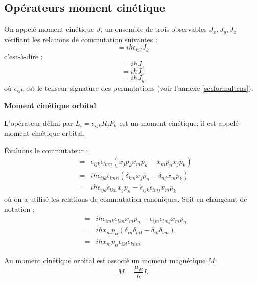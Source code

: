 \documentclass[12pt]{book}
\begin{document}
\subsection{Op\'erateurs moment cin\'etique}
\begin{defn}
On appel\'e moment cin\'etique
$J$, un ensemble de trois observables 
$J_x,J_y,J_z$ v\'erifiant les relations de commutation suivantes :
\begin{equation}
[J_i,J_l]=i\hbar\epsilon_{kil}J_k
\end{equation}
c'est-\`a-dire :
\begin{equation}
[J_x,J_y]=i\hbar J_z
\end{equation}
\begin{equation}
[J_y,J_z]=i\hbar J_x
\end{equation}
\begin{equation}
[J_z,J_x]=i\hbar J_y
\end{equation}
o\`u $\epsilon_{ijk}$ est le tenseur signature des permutations (voir l'annexe
\ref{secformultens}).
\end{defn}
\begin{exmp}
{\bf Moment cin\'etique orbital}
\begin{thm}
L'op\'erateur d\'efini par $L_i=\epsilon_{ijk}R_jP_k$ est un moment
cin\'etique; il est appel\'e moment cin\'etique orbital.
\end{thm}
\begin{pf}
\'Evaluons\cite{ph:mecaq:Bohm93} le commutateur :
\begin{eqnarray}
[L_i,L_l]&=&\epsilon_{ijk}\epsilon_{lmn}(x_jp_kx_mp_n-x_mp_nx_jp_k)\\
&=&i\hbar
\epsilon_{ijk}\epsilon_{lmn}(\delta_{km}x_jp_n-\delta_{nj}x_mp_k)\\ 
&=&i\hbar \epsilon_{ijk}\epsilon_{lkn}x_jp_n -
\epsilon_{ijk}\epsilon_{lmj}x_mp_k 
\end{eqnarray}
o\`u on a utilis\'e les relations de commutation canoniques.
Soit en changeant de notation ;
\begin{eqnarray}
[L_i,L_l]&=&i\hbar \epsilon_{imk}\epsilon_{lkn}x_mp_n -
\epsilon_{ijn}\epsilon_{lmj}x_mp_n\\
&=&i\hbar x_mp_n(\delta_{in}\delta_{ml}-\delta_{nl}\delta_{im})\\
&=&i\hbar x_mp_n\epsilon_{ikl}\epsilon_{knm}
\end{eqnarray}
\end{pf}
\begin{postulat}
Au moment cin\'etique orbital est associ\'e un moment magn\'etique $M$:
\begin{equation}
M=\frac{\mu_B}{\hbar}L
\end{equation}
\end{postulat}
\end{exmp}
\end{document}
